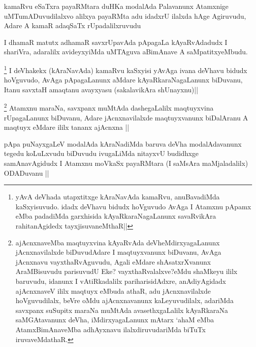 \begin{artha}
kamaRvu eSaTxra payaRMtara duHKa modalAda Palavanunx Atamxnige uMTumADuvudilalxvo alilxya payaRMta adu idadxrU ilalxda hAge Agiruvudu, Adare A kamaR adaqSaTx rUpadalilxruvudu
\end{artha}


\begin{artha}
I dhamaR matutx adhamaR savxrUpavAda pApagaLa kAyaRvAdadudx I shariVra, adaralilx avideyxyiMda uMTAguva aBimAnave A saMpatitxyeMbudu.
\end{artha}


\begin{artha}
\footnote[1]{yAvA deVhada utapxtitxge kAraNavAda kamaRvu, anuBavadiMda kaSxyisuvudo. idadx deVhavu bidudx hoVguvudo AvAga I Atamxnu pApamx eMba padadiMda garxhisida kAyaRkaraNagaLanunx savaRvikAra rahitanAgidedx tayxjisuvaneMthaR||}
I deVhakekx (kAraNavAda) kamaRvu kaSxyisi yAvAga ivana deVhavu bidudx hoVguvudo, AvAga pApagaLanunx aMdare kAyaRkaraNagaLanunx biDuvanu, Itanu savxtaH amaqtanu avayxyasu (sakalavikAra shUnayxnu)||
\end{artha}

\begin{artha}
\footnote[2]{ajAcnxnaveMba maqtuyxvina kAyaRvAda deVheMdirxyagaLanunx jAcnxnavilalxde biDuvudAdare I maqtuyxvanunx biDuvanu, AvAga jAcnxnavu vayxthaRvAguvudu, Agali eMdare shAsatxrXvanunx AraMBisuvudu parisuvudU Eke? vayxthaRvalalxve?eMdu shaMkeyu ililx baruvudu, idanunx I vAtiRkadalilx pariharisidAdxre, anAdiyAgidadx ajAcnxnaveV ililx maqtuyx eMbuda athaR, adu jAcnxnavilalxde hoVguvudilalx, beVre oMdu ajAcnxnavanunx kaLeyuvudilalx, adariMda savxpanx suSupitx maraNa muMtAda avasethxgaLalilx kAyaRkaraNa saMGAtavanunx deVha, iMdirxyagaLanunx mAtarx `ahaM eMba AtamxBimAnaveMba adhAyxnavu ilalxdiruvudariMda biTuTx iruvaveMdathaR.}
Atamxnu maraNa, savxpanx muMtAda dashegaLalilx maqtuyxvina rUpagaLanunx biDuvanu, Adare jAcnxnavilalxde maqtuyxvanunx biDalAranu A maqtuyx eMdare ililx tananx ajAcnxna ||
\end{artha}


\begin{artha}
pApa puNayxgaLeV modalAda kAraNadiMda baruva deVha modalAdavanunx tegedu koLuLxvudu biDuvudu ivugaLiMda nitayxvU budidhxge samAnavAgidudx I Atamxnu moVkaSx payaRMtara (I saMsAra maMjaladalilx) ODADuvanu ||
\end{artha}

